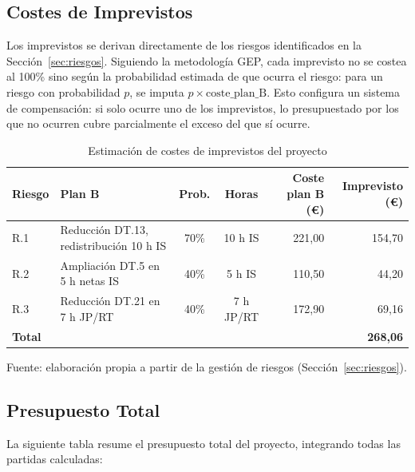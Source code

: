 \documentclass{article}
\begin{document}
    \subsection{Costes de Imprevistos}
    \normalsize
    \setlength{\parskip}{0.6em}
    \justify
    Los imprevistos se derivan directamente de los riesgos identificados en la 
    Sección~\ref{sec:riesgos}. Siguiendo la metodología GEP, cada imprevisto no 
    se costea al 100\% sino según la probabilidad estimada de que ocurra el riesgo: 
    para un riesgo con probabilidad $p$, se imputa $p \times \text{coste\_plan\_B}$. 
    Esto configura un sistema de compensación: si solo ocurre uno de los imprevistos, 
    lo presupuestado por los que no ocurren cubre parcialmente el exceso del que sí ocurre.

    \begin{table}[H]
    \centering
    \begin{tabular}{lp{3.5cm}ccrr}
    \hline
    \textbf{Riesgo} & \textbf{Plan B} & \textbf{Prob.} & \textbf{Horas} & 
    \textbf{Coste plan B (\euro)} & \textbf{Imprevisto (\euro)} \\
    \hline
    R.1 & Reducción DT.13, redistribución 10 h IS & 70\% & 10 h IS & 221,00 & 154,70 \\
    R.2 & Ampliación DT.5 en 5 h netas IS & 40\% & 5 h IS  & 110,50 &  44,20 \\
    R.3 & Reducción DT.21 en 7 h JP/RT & 40\% & 7 h JP/RT & 172,90 &  69,16 \\
    \hline
    \textbf{Total} & & & & & \textbf{268,06} \\
    \hline
    \end{tabular}
    \caption{Estimación de costes de imprevistos del proyecto}
    \label{tab:imprevistos}
    \footnotesize Fuente: elaboración propia a partir de la gestión de riesgos 
    (Sección~\ref{sec:riesgos}).
    \end{table}

    \subsection{Presupuesto Total}
    \normalsize
    \setlength{\parskip}{0.6em}
    \justify
    La siguiente tabla resume el presupuesto total del proyecto, integrando todas 
    las partidas calculadas:
\end{document}
